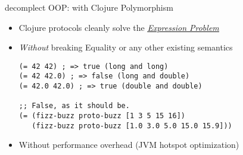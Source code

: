 \documentclass[presentation]{beamer}
\begin{document}
\begin{frame}[label={sec:orga0b0dec},fragile]{decomplect OOP: with Clojure Polymorphism}
 \begin{itemize}
\item Clojure protocols cleanly solve the \uline{\emph{\href{https://en.wikipedia.org/wiki/Expression\_problem}{Expression Problem}}}
\item \emph{\alert{Without}} breaking Equality or any other existing semantics
\begin{verbatim}
(= 42 42) ; => true (long and long)
(= 42 42.0) ; => false (long and double)
(= 42.0 42.0) ; => true (double and double)

;; False, as it should be.
(= (fizz-buzz proto-buzz [1 3 5 15 16])
   (fizz-buzz proto-buzz [1.0 3.0 5.0 15.0 15.9]))
\end{verbatim}
\item Without performance overhead (JVM hotspot optimization)
\end{itemize}
\end{frame}
\end{document}
